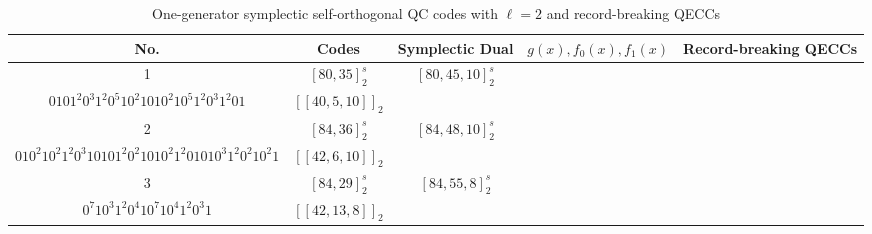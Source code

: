 \documentclass[journal]{IEEEtran}
\begin{document}
\begin{table}[!t]
	\caption{One-generator symplectic self-orthogonal QC codes with $\ell=2$ and record-breaking  QECCs}\label{F_QECCs}
	\centering
	\footnotesize
	\begin{tabular}{ccccc}
		\hline
		No. &Codes      &Symplectic Dual   &                                                                                                                                                                                                                             $g(x),f_0(x),f_1(x)$                                                                                                                                                                                                                              &    Record-breaking  QECCs     \\ \hline
		 1  &  $[80,35]_2^s$  &  $[80,45,10]_2^s$   &                                                                                                                     \makecell[c]{$1^{2}0^{2}1^2$, $0^{4}1^{3}01^{3}0101^{3}0^{2}10^{2}1^{3}0101^{3}01^3$,\\
			$0101^{2}0^{3}1^{2}0^{5}10^{2}1010^{2}10^{5}1^{2}0^{3}1^{2}01$}                                                                                                                      & $[[40,5,10]]_2$  \\
		 2  &  $[84,36]_2^s$  &  $[84,48,10]_2^s$   &                                                                                                                                                \makecell[c]{$101^2,1^{3}0^{3}1^{2}01^{3}0101^{2}0^{3}1^{3}0^{3}1^{2}0101^{3}01^{2}0^{3}1^2$,\\$010^{2}10^{2}1^{2}0^{3}10101^{2}0^{2}1010^{2}1^{2}01010^{3}1^{2}0^{2}10^{2}1$}                                                                                                                                                 & $[[42,6,10]]_2$  \\
		 3  &  $[84,29]_2^s$  &   $[84,55,8]_2^s$   &                                                                                                                                                     \makecell[c]{$101010^{3}10^{3}1,1^{2}0^{2}101^{2}0^{2}1^{3}01^{2}01^{2}01^{3}01^{2}01^{2}01^{3}0^{2}1^{2}010^{2}1$,\\$0^{7}10^{3}1^{2}0^{4}10^{7}10^{4}1^{2}0^{3}1$}                                                                                                                                                      & $[[42,13,8]]_2$  \\

\end{tabular}
\end{table}
\end{document}
